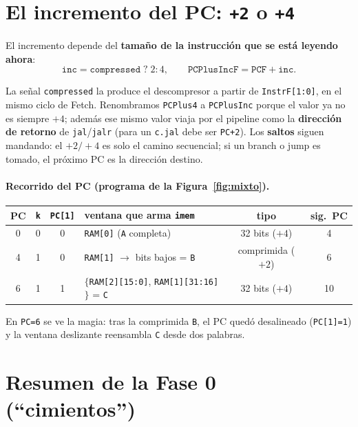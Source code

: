 \documentclass[11pt]{article}
\newcommand{\code}[1]{\texttt{#1}}
\begin{document}
\section{El incremento del PC: \texttt{+2} o \texttt{+4}}

El incremento depende del \textbf{tamaño de la instrucción que se está leyendo
ahora}:
\[
\code{inc} = \code{compressed}\;?\;2 : 4,
\qquad
\code{PCPlusIncF} = \code{PCF} + \code{inc}.
\]

La señal \code{compressed} la produce el descompresor a partir de
\code{InstrF[1:0]}, en el mismo ciclo de Fetch. Renombramos \code{PCPlus4} a
\code{PCPlusInc} porque el valor ya no es siempre $+4$; además ese mismo valor
viaja por el pipeline como la \textbf{dirección de retorno} de \code{jal}/\code{jalr}
(para un \code{c.jal} debe ser \code{PC+2}). Los \textbf{saltos} siguen mandando:
el $+2/+4$ es solo el camino secuencial; si un branch o jump es tomado, el
próximo PC es la dirección destino.

\paragraph{Recorrido del PC (programa de la Figura~\ref{fig:mixto}).}
\begin{center}
\small
\begin{tabular}{@{}cccp{6.0cm}cc@{}}
\toprule
PC & \code{k} & \code{PC[1]} & ventana que arma \code{imem} & tipo & sig.\ PC \\
\midrule
0 & 0 & 0 & \code{RAM[0]} (\code{A} completa)                          & 32 bits ($+4$) & 4 \\
4 & 1 & 0 & \code{RAM[1]} $\to$ bits bajos = \code{B}                   & comprimida ($+2$) & 6 \\
6 & 1 & 1 & $\{$\code{RAM[2][15:0]}, \code{RAM[1][31:16]}$\}$ = \code{C} & 32 bits ($+4$) & 10 \\
\bottomrule
\end{tabular}
\end{center}

\noindent
En \code{PC=6} se ve la magia: tras la comprimida \code{B}, el PC quedó
desalineado (\code{PC[1]=1}) y la ventana deslizante reensambla \code{C} desde dos
palabras.

\section{Resumen de la Fase 0 (``cimientos'')}
\end{document}
